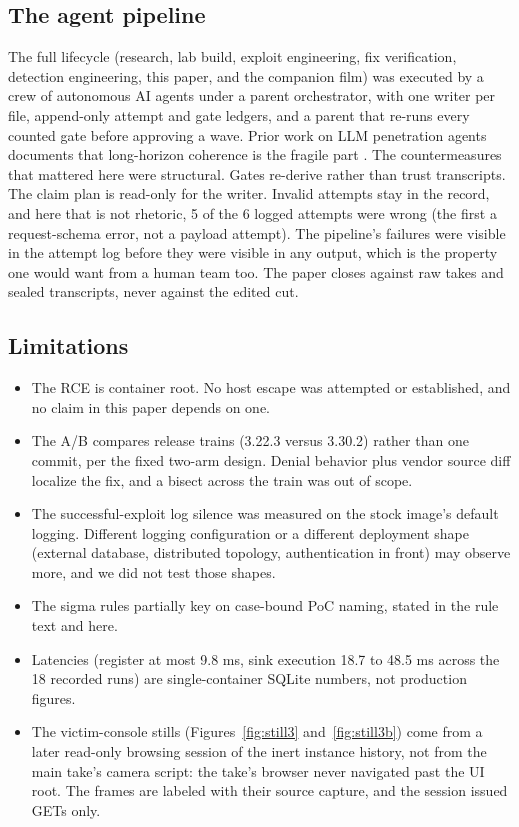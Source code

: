 \documentclass[journal]{IEEEtran}
\begin{document}
\subsection{The agent pipeline}

The full lifecycle (research, lab build, exploit engineering, fix
verification, detection engineering, this paper, and the companion film) was
executed by a crew of autonomous AI agents under a parent orchestrator, with
one writer per file, append-only attempt and gate ledgers, and a parent that
re-runs every counted gate before approving a wave. Prior work on LLM
penetration agents documents that long-horizon coherence is the fragile part
\cite{wang2025checkmate}. The countermeasures that mattered here were
structural. Gates re-derive rather than trust transcripts. The claim plan is
read-only for the writer. Invalid attempts stay in the record, and here that
is not rhetoric, 5 of the 6 logged attempts were wrong (the first a
request-schema error, not a payload attempt). The
pipeline's failures were visible in the attempt log before they were visible
in any output, which is the property one would want from a human team too. The
paper closes against raw takes and sealed transcripts, never against the
edited cut.

\subsection{Limitations}

\begin{itemize}
\item The RCE is container root. No host escape was attempted or established,
and no claim in this paper depends on one.
\item The A/B compares release trains (3.22.3 versus 3.30.2) rather than one
commit, per the fixed two-arm design. Denial behavior plus vendor source diff
localize the fix, and a bisect across the train was out of scope.
\item The successful-exploit log silence was measured on the stock image's
default logging. Different logging configuration or a different deployment
shape (external database, distributed topology, authentication in front) may
observe more, and we did not test those shapes.
\item The sigma rules partially key on case-bound PoC naming, stated in the
rule text and here.
\item Latencies (register at most 9.8 ms, sink execution 18.7 to 48.5 ms
across the 18 recorded runs) are
single-container SQLite numbers, not production figures.
\item The victim-console stills (Figures~\ref{fig:still3}
and~\ref{fig:still3b}) come from a later read-only browsing session of the
inert instance history, not from the main take's camera script: the take's
browser never navigated past the UI root. The frames are labeled with their
source capture, and the session issued GETs only.
\end{itemize}
\end{document}
